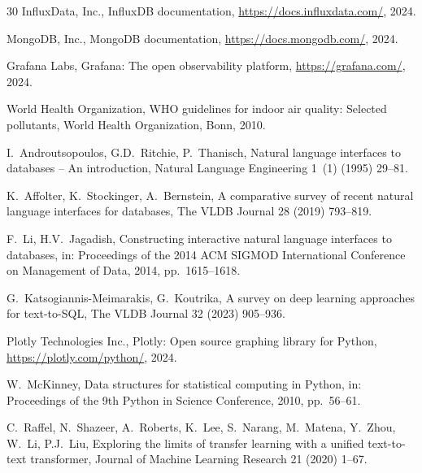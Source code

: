 \documentclass[preprint,12pt,a4paper]{elsarticle}
\begin{document}
\begin{thebibliography}{30}
{InfluxData, Inc.},
{InfluxDB} documentation,
\url{https://docs.influxdata.com/}, 2024.

{MongoDB, Inc.},
{MongoDB} documentation,
\url{https://docs.mongodb.com/}, 2024.

{Grafana Labs},
{Grafana}: The open observability platform,
\url{https://grafana.com/}, 2024.

{World Health Organization},
{WHO} guidelines for indoor air quality: Selected pollutants,
World Health Organization, Bonn, 2010.

I.~Androutsopoulos, G.D.~Ritchie, P.~Thanisch,
Natural language interfaces to databases -- An introduction,
Natural Language Engineering 1~(1) (1995) 29--81.

K.~Affolter, K.~Stockinger, A.~Bernstein,
A comparative survey of recent natural language interfaces for databases,
The {VLDB} Journal 28 (2019) 793--819.

F.~Li, H.V.~Jagadish,
Constructing interactive natural language interfaces to databases,
in: Proceedings of the 2014 {ACM SIGMOD} International Conference on Management of Data, 2014, pp.~1615--1618.

G.~Katsogiannis-Meimarakis, G.~Koutrika,
A survey on deep learning approaches for text-to-{SQL},
The {VLDB} Journal 32 (2023) 905--936.

{Plotly Technologies Inc.},
{Plotly}: Open source graphing library for {Python},
\url{https://plotly.com/python/}, 2024.

W.~McKinney,
Data structures for statistical computing in {Python},
in: Proceedings of the 9th {Python} in Science Conference, 2010, pp.~56--61.

C.~Raffel, N.~Shazeer, A.~Roberts, K.~Lee, S.~Narang, M.~Matena, Y.~Zhou, W.~Li, P.J.~Liu,
Exploring the limits of transfer learning with a unified text-to-text transformer,
Journal of Machine Learning Research 21 (2020) 1--67.

\end{thebibliography}
\end{document}
